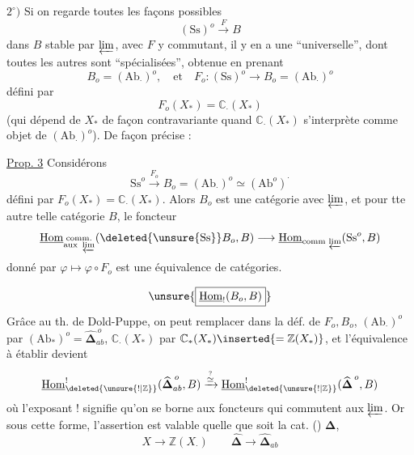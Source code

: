 $2^\circ)$ Si on regarde toutes les façons possibles
\[
(\mathrm{Ss})^o\xrightarrow{F}B
\]
dans $B$ stable par $\varprojlim$, avec $F$ y
commutant, il y en a  une
``universelle'', dont toutes les autres sont
``spécialisées'', obtenue en prenant
\[
B_o=(\mathrm{Ab}_\cdot)^o,\quad\text{et}\quad
F_o:(\mathrm{Ss})^o\longrightarrow B_o=(\mathrm{Ab}_\cdot)^o
\]
défini par
\[
F_o(X_*)=\mathbb C_\cdot(X_*)
\]
(qui dépend de $X_*$ de façon contravariante
quand $\mathbb C_\cdot(X_*)$ s'interprète comme
objet de $(\mathrm{Ab}_\cdot)^o$). De façon précise :

\uline{Prop. 3} Considérons
\[
\mathrm{Ss}^o\xrightarrow{F_o}B_o=(\mathrm{Ab}_\cdot)^o\simeq(\mathrm{Ab}^o)^\cdot
\]
défini par $F_o(X_*)=\mathbb C_\cdot(X_*)$. Alors
$B_o$ est une catégorie  avec $\varprojlim$, et
pour tte autre telle catégorie $B$,
le foncteur
\[
\underline{\operatorname{Hom}}_{\substack{\mathrm{comm.}\\\text{aux }\varprojlim}}
(\deleted{\unsure{\mathrm{Ss}}}B_o,B)\longrightarrow
\underline{\operatorname{Hom}}_{\mathrm{comm}\,\varprojlim}(\mathrm{Ss}^o,B)
\]
donné par $\varphi\longmapsto\varphi\circ F_o$
est une équivalence de catégories.

\[
\unsure{\boxed{\underline{\operatorname{Hom}}_!(B_o,B)}}
\]
Grâce au th. de Dold-Puppe, on peut
remplacer dans la déf. de
$F_o,B_o$, $(\mathrm{Ab}_\cdot)^o$ par $(\mathrm{Ab}_*)^o=\widehat{\boldsymbol\Delta}_{ab}^{\,o}$,
$\mathbb C_\cdot(X_*)$ par $\mathbb C_*(X_*)\inserted{=\mathbb Z(X_*)}$, et l'équivalence à établir
devient
\[
\underline{\operatorname{Hom}}^{!}_{\deleted{\unsure{!|\mathbb Z}}}
(\widehat{\boldsymbol\Delta}_{ab}^{\,o},B)
\xrightarrow{\overset{?}{\simeq}}
\underline{\operatorname{Hom}}^{!}_{\deleted{\unsure{!|\mathbb Z}}}(\widehat{\boldsymbol\Delta}^{\,o},B)
\]
où l'exposant ! signifie qu'on se borne
aux foncteurs qui commutent aux $\varprojlim$.
Or sous cette forme, l'assertion est
valable quelle que soit la cat. ()
$\boldsymbol\Delta$, 
\[
X\longrightarrow\mathbb Z(X_\cdot)\qquad
\widehat{\boldsymbol\Delta}\longrightarrow\widehat{\boldsymbol\Delta}_{ab}
\]

